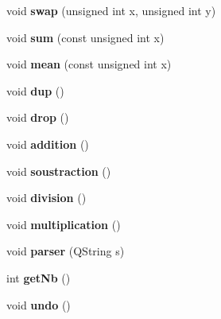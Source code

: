 \begin{DoxyCompactItemize}
\item 
\hypertarget{class_pile_ab6c3f9840427e2be87e0d76c8697fff5}{void {\bfseries swap} (unsigned int x, unsigned int y)}\label{class_pile_ab6c3f9840427e2be87e0d76c8697fff5}

\item 
\hypertarget{class_pile_ab2671569b6870d06fb94179e998e2e2e}{void {\bfseries sum} (const unsigned int x)}\label{class_pile_ab2671569b6870d06fb94179e998e2e2e}

\item 
\hypertarget{class_pile_a3993e0e33e78011663b15b9eb723d456}{void {\bfseries mean} (const unsigned int x)}\label{class_pile_a3993e0e33e78011663b15b9eb723d456}

\item 
\hypertarget{class_pile_a081f7843d01cae1f0f7be7d92e46d5d2}{void {\bfseries dup} ()}\label{class_pile_a081f7843d01cae1f0f7be7d92e46d5d2}

\item 
\hypertarget{class_pile_a7488ed257c6ceb16ed57a9fffb0726d5}{void {\bfseries drop} ()}\label{class_pile_a7488ed257c6ceb16ed57a9fffb0726d5}

\item 
\hypertarget{class_pile_a2f7afa189e97a23a836f07f9898538cf}{void {\bfseries addition} ()}\label{class_pile_a2f7afa189e97a23a836f07f9898538cf}

\item 
\hypertarget{class_pile_ab1827b113fff2c3fa59ebbe4c5902b1b}{void {\bfseries soustraction} ()}\label{class_pile_ab1827b113fff2c3fa59ebbe4c5902b1b}

\item 
\hypertarget{class_pile_a48ef99542609f5033f58ebd23189f698}{void {\bfseries division} ()}\label{class_pile_a48ef99542609f5033f58ebd23189f698}

\item 
\hypertarget{class_pile_ae5006ad08419fc6dcf65cbb4970199fe}{void {\bfseries multiplication} ()}\label{class_pile_ae5006ad08419fc6dcf65cbb4970199fe}

\item 
\hypertarget{class_pile_ac0be84cde5594e29678125e600bd8898}{void {\bfseries parser} (Q\-String s)}\label{class_pile_ac0be84cde5594e29678125e600bd8898}

\item 
\hypertarget{class_pile_acc36fadfcc65c9863a9d1d8d5dbe859a}{int {\bfseries get\-Nb} ()}\label{class_pile_acc36fadfcc65c9863a9d1d8d5dbe859a}

\item 
\hypertarget{class_pile_af91a4b277236024aa5aab9ef410881bb}{void {\bfseries undo} ()}\label{class_pile_af91a4b277236024aa5aab9ef410881bb}


\end{DoxyCompactItemize}
